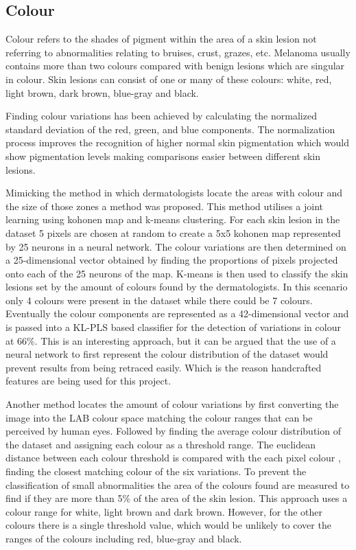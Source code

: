 \documentclass[12pt]{report}
\begin{document}
\subsection{Colour}
Colour refers to the shades of pigment within the area of a skin lesion not referring to abnormalities relating to bruises, crust, grazes, etc. Melanoma usually contains more than two colours compared with benign lesions which are singular in colour. Skin lesions can consist of one or many of these colours: white, red, light brown, dark brown, blue-gray and black.

Finding colour variations has been achieved by calculating the normalized standard deviation of the red, green, and blue components\cite{She2007}. The normalization process improves the recognition of higher normal skin pigmentation which would show pigmentation levels making comparisons easier between different skin lesions.

Mimicking the method in which dermatologists locate the areas with colour and the size of those zones a method was proposed\cite{Tenenhaus2010}. This method utilises a joint learning using kohonen map and k-means clustering. For each skin lesion in the dataset 5 pixels are chosen at random to create a 5x5 kohonen map represented by 25 neurons in a neural network. The colour variations are then determined on a 25-dimensional vector obtained by finding the proportions of pixels projected onto each of the 25 neurons of the map. K-means is then used to classify the skin lesions set by the amount of colours found by the dermatologists. In this scenario only 4 colours were present in the dataset while there could be 7 colours. Eventually the colour components are represented as a 42-dimensional vector and is passed into a KL-PLS based classifier for the detection of variations in colour at 66\%. This is an interesting approach, but it can be argued that the use of a neural network to first represent the colour distribution of the dataset would prevent results from being retraced easily. Which is the reason handcrafted features are being used for this project.

Another method locates the amount of colour variations by first converting the image into the LAB colour space matching the colour ranges that can be perceived by human eyes. Followed by finding the average colour distribution of the dataset and assigning each colour as a threshold range. The euclidean distance between each colour threshold is compared with the each pixel colour \cite{Kasmi2016a}, finding the closest matching colour of the six variations. To prevent the classification of small abnormalities the area of the colours found are measured to find if they are more than 5\% of the area of the skin lesion. This approach uses a colour range for white, light brown and dark brown. However, for the other colours there is a single threshold value, which would be unlikely to cover the ranges of the colours including red, blue-gray and black.
\end{document}

